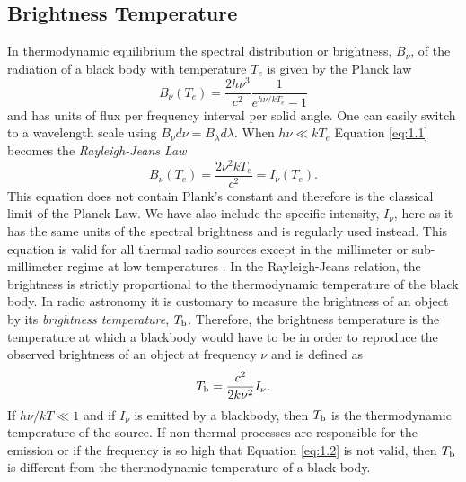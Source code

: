 \subsection{Brightness Temperature}\label{subsec:3.1.1}
In thermodynamic equilibrium the spectral distribution or brightness, $B_{\nu}$, of the radiation of a black body with temperature $T_{e}$ is given by the Planck law
\begin{equation}\label{eq:1.1}
B_{\nu}(T_{e})=\frac{2h\nu ^3}{c^2}\frac{1}{e^{h\nu /kT_{e}}-1}
\end{equation}
and has units of flux per frequency interval per solid angle. One can easily switch to a wavelength scale using  $B_{\nu}d\nu = B_{\lambda}d\lambda$. When $h\nu \ll kT_{e}$ Equation \ref{eq:1.1} becomes the \textit{Rayleigh-Jeans Law}
\begin{equation}
\label{eq:1.2}
B_{\nu}(T_{e})=\dfrac{2\nu ^2kT_{e}}{c^2}=I_{\nu}(T_{e}).
\end{equation}
This equation does not contain Plank's constant and therefore is the classical limit of the Planck Law. We have also include the specific intensity, $I_{\nu}$, here as it has the same units of the spectral brightness and is regularly used instead. This equation is valid for all thermal radio sources except in the millimeter or sub-millimeter regime at low temperatures \citep{rohlfs_1996}. In the Rayleigh-Jeans relation, the brightness is strictly proportional to the thermodynamic temperature of the black body. In radio astronomy it is customary to measure the brightness of an object by its \textit{brightness temperature}, $T_{\rm{b}}$. Therefore, the brightness temperature is the temperature at which a blackbody would have to be in order to reproduce the observed brightness of an object at frequency $\nu$ and is defined as
\begin{equation}\label{eq:1.3}
T_{\rm{b}}=\frac{c^2}{2k\nu ^2}I_{\nu}. 
\end{equation}
If $h\nu /kT \ll 1$ and if $I_{\nu}$ is emitted by a blackbody, then $T_{\rm{b}}$ is the thermodynamic temperature of the source. If non-thermal processes are responsible for the emission or if the frequency is so high that Equation \ref{eq:1.2} is not valid, then $T_{\rm{b}}$ is different from the thermodynamic temperature of a black body.

